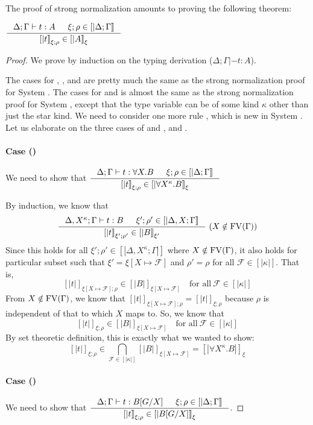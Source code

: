 The proof of strong normalization amounts to proving the following theorem:
\begin{theorem}
$ \inference{\Delta;\Gamma|- t:A & \xi;\rho \in [|\Delta;\Gamma|]}
            {[|t|]_{\xi;\rho} \in [|A|]_\xi} $
\end{theorem}
\begin{proof}
We prove by induction on the typing derivation ($\Delta;\Gamma |- t:A$).

The cases for , , and  are pretty
much the same as the strong normalization proof for System \F.
The cases for  and  is almost the same
as the strong normalization proof for System \F, except that the type variable
can be of some kind $\kappa$ other than just the star kind.
We need to consider one more rule , which is new in System \Fw.
Let us elaborate on the three cases of
 and , and .

\paragraph{Case ()}
We need to show that
$ \inference{\Delta;\Gamma |- t : \forall X.B & \xi;\rho\in[|\Delta;\Gamma|]}
        {[|t|]_{\xi;\rho} \in [|\forall X^\kappa.B|]_\xi} $

By induction, we know that
\[ \inference{\Delta,X^\kappa;\Gamma |- t:B & \xi';\rho'\in[|\Delta,X;\Gamma|]}
        {[|t|]_{\xi';\rho'} \in [|B|]_{\xi'}} ~
        (X\notin\FV(\Gamma))
\]
Since this holds for all $\xi';\rho' \in [|\Delta,X^\kappa;\Gamma|]$ where
$X\notin\mathop{\mathrm{FV}}(\Gamma)$, it also holds for particular subset such that
$\xi' = \xi[X\mapsto\mathcal{F}]$ and $\rho'=\rho$ for all $\mathcal{F}\in[|\kappa|]$.
That is,
\[ [|t|]_{\xi[X\mapsto\mathcal{F}];\rho} \in [|B|]_{\xi[X\mapsto\mathcal{F}]}
        \quad \text{for all}~\mathcal{F}\in[|\kappa|] \]
From $X\notin\mathop{\mathrm{FV}}(\Gamma)$, we know that
$[|t|]_{\xi[X\mapsto\mathcal{F}];\rho} = [|t|]_{\xi;\rho}$
because $\rho$ is independent of that to which $X$ maps to.
So, we know that
\[ [|t|]_{\xi;\rho} \in [|B|]_{\xi[X\mapsto\mathcal{F}]}
        \quad \text{for all}~\mathcal{F}\in[|\kappa|] \]
By set theoretic definition, this is exactly what we wanted to show:
\[ [|t|]_{\xi;\rho} \in
        \bigcap_{\mathcal{F}\in[|\kappa|]} [|B|]_{\xi[X\mapsto\mathcal{F}]}
        = [|\forall X^\kappa.B|]_\xi
\]

\paragraph{Case ()}
We need to show that
$ \inference{\Delta;\Gamma |- t : B[G/X] & \xi;\rho\in[|\Delta;\Gamma|]}
        {[|t|]_{\xi;\rho} \in [|B[G/X]|]_\xi} $.


\end{proof}
